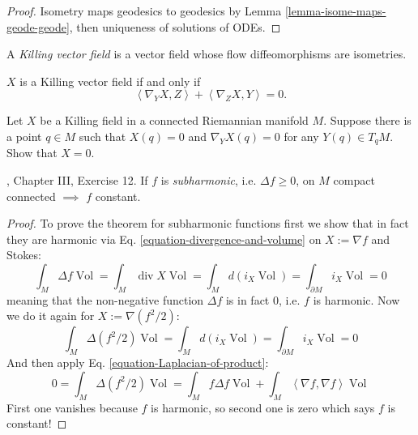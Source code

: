 \documentclass{book}
\begin{document}
\begin{proof}
Isometry maps geodesics to geodesics by Lemma
\ref{lemma-isome-maps-geode-geode},
then uniqueness of solutions
of ODEs.
\end{proof}

\begin{definition}
\label{definition-killing}
A {\it Killing vector field} is a vector
field
whose flow diffeomorphisms are isometries.
\end{definition}

\begin{exercise}
\label{exercise-killing}
$X$ is a Killing vector field if and only if
$$
\left\langle{}\nabla_YX,Z\right\rangle{} +
\left\langle{}\nabla_ZX,Y\right\rangle{}=0.
$$
\end{exercise}

\begin{exercise}
\label{exercise-killi-field-zero-order}
Let $X$ be a Killing field in a connected
Riemannian manifold $M$.
Suppose there is a point $q \in M$ such that
$X(q)=0$ and $\nabla_YX(q)=0$ for any $Y(q)
\in T_qM$.
Show that $X=0$.
\end{exercise}


\begin{exercise}
\label{exercise-maximum-principle}
\cite{doc}, Chapter III, Exercise 12. If $f$
is {\it subharmonic}, i.e.
$\Delta f\geq 0$, on $M$
compact connected $\implies$ $f$ constant.
\end{exercise}

\begin{proof}
To prove the theorem for subharmonic
functions first we show that in fact they
are harmonic via Eq.
\ref{equation-divergence-and-volume}
on $X:= \nabla f$ and Stokes:
$$
\int_M \Delta f \operatorname{Vol}=\int_M
\operatorname{div}X \operatorname{Vol}
=\int_M d(i_X
\operatorname{Vol})=\int_{\partial M}i_X
\operatorname{Vol}=0
$$
meaning that the non-negative function
$\Delta f$ is in fact 0, i.e. $f$ is
harmonic. Now we do it again for
$X:=\nabla(f^2/2)$:
$$
\int_M \Delta(f^2/2)\operatorname{Vol}
=\int_M d(i_X \operatorname{Vol})
=\int_{\partial M}i_X \operatorname{Vol}
=0
$$
And then apply Eq.
\ref{equation-Laplacian-of-product}:
$$
0=\int_M \Delta(f^2/2)\operatorname{Vol}
=\int_M f \Delta f \operatorname{Vol}
+\int_M \left\langle{}\nabla f,\nabla
f\right\rangle{}\operatorname{Vol}
$$
First one vanishes because $f$ is harmonic,
so second one is zero which says
 $f$ is constant!
\end{proof}
\end{document}
